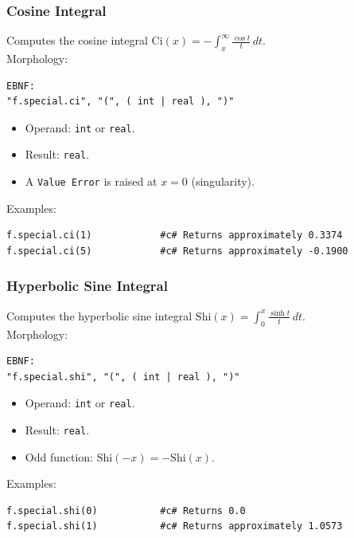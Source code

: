 \subsubsection{Cosine Integral}
Computes the cosine integral $\text{Ci}(x) = -\int_x^{\infty} \frac{\cos t}{t}\,dt$. \\
Morphology:
\begin{verbatim}
EBNF:
"f.special.ci", "(", ( int | real ), ")"
\end{verbatim}
\begin{itemize}
\item Operand: \texttt{int} or \texttt{real}.
\item Result: \texttt{real}.
\item A \texttt{Value Error} is raised at $x = 0$ (singularity).
\end{itemize}
Examples:
\begin{verbatim}
f.special.ci(1)            #c# Returns approximately 0.3374
f.special.ci(5)            #c# Returns approximately -0.1900
\end{verbatim}

\subsubsection{Hyperbolic Sine Integral}
Computes the hyperbolic sine integral $\text{Shi}(x) = \int_0^x \frac{\sinh t}{t}\,dt$. \\
Morphology:
\begin{verbatim}
EBNF:
"f.special.shi", "(", ( int | real ), ")"
\end{verbatim}
\begin{itemize}
\item Operand: \texttt{int} or \texttt{real}.
\item Result: \texttt{real}.
\item Odd function: $\text{Shi}(-x) = -\text{Shi}(x)$.
\end{itemize}
Examples:
\begin{verbatim}
f.special.shi(0)           #c# Returns 0.0
f.special.shi(1)           #c# Returns approximately 1.0573
\end{verbatim}

